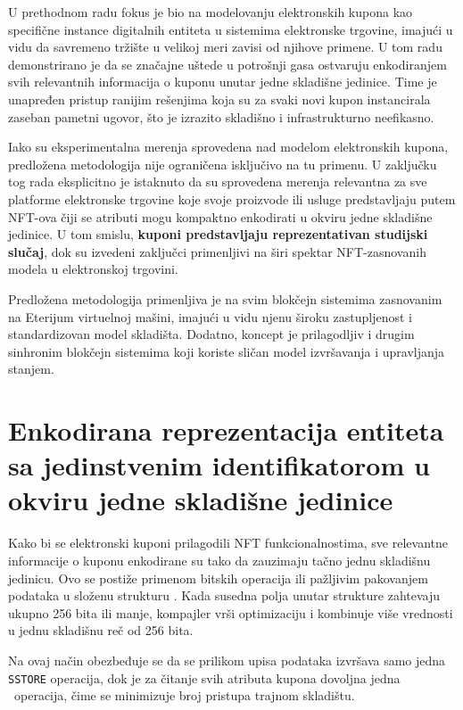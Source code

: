 U prethodnom radu \cite{tasic2024cost} fokus je bio na modelovanju elektronskih kupona kao specifične instance digitalnih entiteta u sistemima elektronske trgovine, imajući u vidu da savremeno tržište u velikoj meri zavisi od njihove primene. U tom radu demonstrirano je da se značajne uštede u potrošnji gasa ostvaruju enkodiranjem svih relevantnih informacija o kuponu unutar jedne skladišne jedinice. Time je unapređen pristup ranijim rešenjima koja su za svaki novi kupon instancirala zaseban pametni ugovor, što je izrazito skladišno i infrastrukturno neefikasno.

Iako su eksperimentalna merenja sprovedena nad modelom elektronskih kupona, predložena metodologija nije ograničena isključivo na tu primenu. U zaključku tog rada eksplicitno je istaknuto da su sprovedena merenja relevantna za sve platforme elektronske trgovine koje svoje proizvode ili usluge predstavljaju putem NFT-ova čiji se atributi mogu kompaktno enkodirati u okviru jedne skladišne jedinice. U tom smislu, \textbf{kuponi predstavljaju reprezentativan studijski slučaj}, dok su izvedeni zaključci primenljivi na širi spektar NFT-zasnovanih modela u elektronskoj trgovini.

Predložena metodologija primenljiva je na svim blokčejn sistemima zasnovanim na Eterijum virtuelnoj mašini, imajući u vidu njenu široku zastupljenost i standardizovan model skladišta. Dodatno, koncept je prilagodljiv i drugim sinhronim blokčejn sistemima koji koriste sličan model izvršavanja i upravljanja stanjem.

\section{Enkodirana reprezentacija entiteta sa jedinstvenim identifikatorom u okviru jedne skladišne jedinice}
Kako bi se elektronski kuponi prilagodili NFT funkcionalnostima, sve relevantne informacije o kuponu enkodirane su tako da zauzimaju tačno jednu skladišnu jedinicu. Ovo se postiže primenom bitskih operacija ili pažljivim pakovanjem podataka u složenu strukturu \cite{marchesi2020design}. Kada susedna polja unutar strukture zahtevaju ukupno 256 bita ili manje, kompajler vrši optimizaciju i kombinuje više vrednosti u jednu skladišnu reč od 256 bita.

Na ovaj način obezbeđuje se da se prilikom upisa podataka izvršava samo jedna \texttt{SSTORE} operacija, dok je za čitanje svih atributa kupona dovoljna jedna \Sl\ operacija, čime se minimizuje broj pristupa trajnom skladištu.

